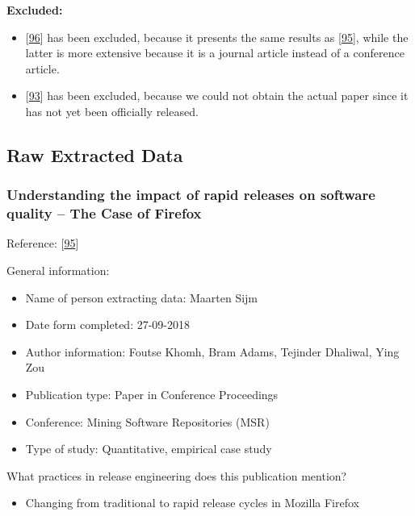 \documentclass[]{book}
\providecommand{\tightlist}{%
  \setlength{\itemsep}{0pt}\setlength{\parskip}{0pt}}
\begin{document}
\textbf{Excluded:}

\begin{itemize}
\tightlist
\item
  {[}\protect\hyperlink{ref-khomh2012a}{96}{]} has been excluded,
  because it presents the same results as
  {[}\protect\hyperlink{ref-khomh2015a}{95}{]}, while the latter is more
  extensive because it is a journal article instead of a conference
  article.
\item
  {[}\protect\hyperlink{ref-kaur2019a}{93}{]} has been excluded, because
  we could not obtain the actual paper since it has not yet been
  officially released.
\end{itemize}

\subsection{Raw Extracted Data}\label{raw-extracted-data}

\subsubsection{Understanding the impact of rapid releases on software
quality -- The Case of
Firefox}\label{understanding-the-impact-of-rapid-releases-on-software-quality-the-case-of-firefox}

Reference: {[}\protect\hyperlink{ref-khomh2015a}{95}{]}

General information:

\begin{itemize}
\tightlist
\item
  Name of person extracting data: Maarten Sijm
\item
  Date form completed: 27-09-2018
\item
  Author information: Foutse Khomh, Bram Adams, Tejinder Dhaliwal, Ying
  Zou
\item
  Publication type: Paper in Conference Proceedings
\item
  Conference: Mining Software Repositories (MSR)
\item
  Type of study: Quantitative, empirical case study
\end{itemize}

What practices in release engineering does this publication mention?

\begin{itemize}
\tightlist
\item
  Changing from traditional to rapid release cycles in Mozilla Firefox
\end{itemize}
\end{document}
